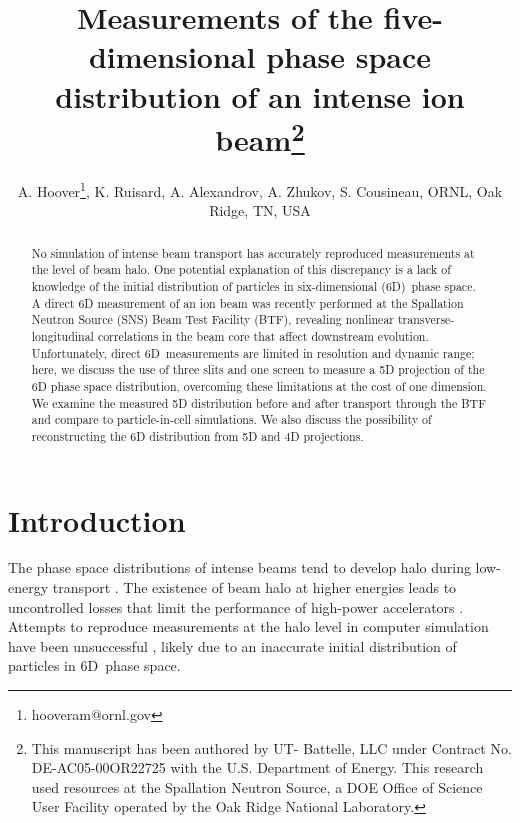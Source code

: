 \documentclass[letterpaper,
               nospread,
               biblatex,
              ]{jacow}
\begin{document}
\title{Measurements of the five-dimensional phase space\\ distribution of an intense ion beam\thanks{This manuscript has been authored by UT- Battelle, LLC under Contract No. DE-AC05-00OR22725 with the U.S. Department of Energy. This research used resources at the Spallation Neutron Source, a DOE Office of Science User Facility operated by the Oak Ridge National Laboratory.}}

\author{A. Hoover\thanks{hooveram@ornl.gov}, K. Ruisard, A. Alexandrov, A. Zhukov, S. Cousineau, ORNL, Oak Ridge, TN, USA}
	
\maketitle

%
\begin{abstract}
No simulation of intense beam transport has accurately reproduced measurements at the level of beam halo. One potential explanation of this discrepancy is a lack of knowledge of the initial distribution of particles in six-dimensional (6D)~phase space. A direct 6D measurement of an ion beam was recently performed at the Spallation Neutron Source (SNS) Beam Test Facility (BTF), revealing nonlinear transverse-longitudinal correlations in the beam core that affect downstream evolution. Unfortunately, direct 6D~measurements are limited in resolution and dynamic range; here, we discuss the use of three slits and one screen to measure a 5D projection of the 6D phase space distribution, overcoming these limitations at the cost of one dimension. We examine the measured 5D distribution before and after transport through the BTF and compare to particle-in-cell simulations. We also discuss the possibility of reconstructing the 6D distribution from 5D and 4D projections.
\end{abstract}

\section{Introduction}

The phase space distributions of intense beams tend to develop halo during low-energy transport \cite{Batygin2021}. The existence of beam halo at higher energies leads to uncontrolled losses that limit the performance of high-power accelerators \cite{Henderson2014}. Attempts to reproduce measurements at the halo level in computer simulation have been unsuccessful \cite{Allen2002, Qiang2002, Groening2008}, likely due to an inaccurate initial distribution of particles in 6D~phase space.
\end{document}
